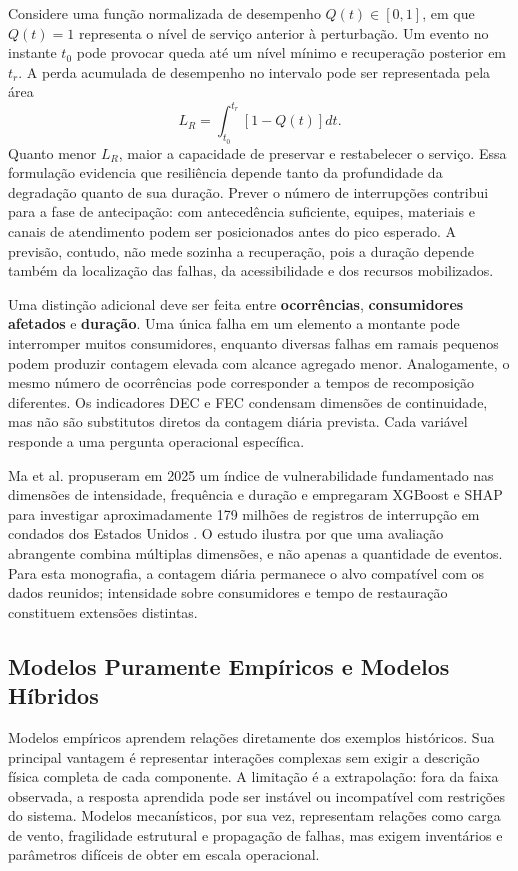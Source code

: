 Considere uma função normalizada de desempenho $Q(t)\in[0,1]$, em que $Q(t)=1$ representa o nível de serviço anterior à perturbação. Um evento no instante $t_0$ pode provocar queda até um nível mínimo e recuperação posterior em $t_r$. A perda acumulada de desempenho no intervalo pode ser representada pela área
\begin{equation}
    L_R=\int_{t_0}^{t_r}\left[1-Q(t)\right]dt.
    \label{eq:perda_resiliencia}
\end{equation}
Quanto menor $L_R$, maior a capacidade de preservar e restabelecer o serviço. Essa formulação evidencia que resiliência depende tanto da profundidade da degradação quanto de sua duração. Prever o número de interrupções contribui para a fase de antecipação: com antecedência suficiente, equipes, materiais e canais de atendimento podem ser posicionados antes do pico esperado. A previsão, contudo, não mede sozinha a recuperação, pois a duração depende também da localização das falhas, da acessibilidade e dos recursos mobilizados.

Uma distinção adicional deve ser feita entre \textbf{ocorrências}, \textbf{consumidores afetados} e \textbf{duração}. Uma única falha em um elemento a montante pode interromper muitos consumidores, enquanto diversas falhas em ramais pequenos podem produzir contagem elevada com alcance agregado menor. Analogamente, o mesmo número de ocorrências pode corresponder a tempos de recomposição diferentes. Os indicadores DEC e FEC condensam dimensões de continuidade, mas não são substitutos diretos da contagem diária prevista. Cada variável responde a uma pergunta operacional específica.

Ma et al. propuseram em 2025 um índice de vulnerabilidade fundamentado nas dimensões de intensidade, frequência e duração e empregaram XGBoost e SHAP para investigar aproximadamente 179 milhões de registros de interrupção em condados dos Estados Unidos \cite{ma2025vulnerability}. O estudo ilustra por que uma avaliação abrangente combina múltiplas dimensões, e não apenas a quantidade de eventos. Para esta monografia, a contagem diária permanece o alvo compatível com os dados reunidos; intensidade sobre consumidores e tempo de restauração constituem extensões distintas.

\subsection{Modelos Puramente Empíricos e Modelos Híbridos}

Modelos empíricos aprendem relações diretamente dos exemplos históricos. Sua principal vantagem é representar interações complexas sem exigir a descrição física completa de cada componente. A limitação é a extrapolação: fora da faixa observada, a resposta aprendida pode ser instável ou incompatível com restrições do sistema. Modelos mecanísticos, por sua vez, representam relações como carga de vento, fragilidade estrutural e propagação de falhas, mas exigem inventários e parâmetros difíceis de obter em escala operacional.

